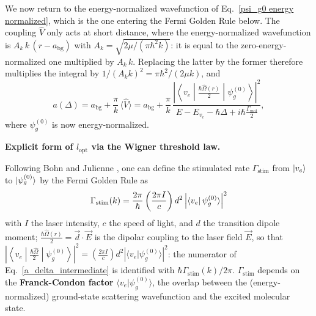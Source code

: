 We now return to the energy-normalized wavefunction of
Eq.~\ref{psi_g0 energy normalized}, which is the one entering the Fermi Golden Rule
below. The coupling $\hat V$ only acts at short distance, where the energy-normalized
wavefunction is $A_k\,k\,(r-a_{\text{bg}})$ with $A_k=\sqrt{2\mu/(\pi\hbar^2k)}$: it is
equal to the zero-energy-normalized one multiplied by $A_k\,k$. Replacing the latter by
the former therefore multiplies the integral by $1/(A_k k)^2=\pi\hbar^2/(2\mu k)$, and
\begin{equation}
    a(\Delta) = a_{\text{bg}} + \frac{\pi}{k}\,\langle\hat V\rangle
    = a_{\text{bg}} + \frac{\pi}{k}\,
    \frac{\left|\left\langle v_e\middle|\frac{\hbar\hat\Omega(r)}{2}\middle|\psi_g^{(0)}\right\rangle\right|^2}
    {E-E_{v_e}-\hbar\Delta+i\hbar\frac{\Gamma_{\text{mol}}}{2}},
    \label{a_delta_intermediate}
\end{equation}
where $\psi_g^{(0)}$ is now energy-normalized.


\textbf{Explicit form of $l_{\text{opt}}$ via the Wigner threshold law.}

Following Bohn and Julienne \cite{bohn1997_prospects}, one can define the
stimulated rate $\Gamma_{\text{stim}}$ from $\ket{v_e}$ to $\ket{\psi_g^{(0)}}$
by the Fermi Golden Rule as
\begin{equation}
    \Gamma_{\text{stim}}(k) = \frac{2\pi}{\hbar}\left(\frac{2\pi I}{c}\right)d^2\left| \bra{v_e} \psi_g^{(0)} \rangle \right|^2
    \label{gamma_stim_def}
\end{equation}
with $I$ the laser intensity, $c$ the speed of light, and $d$ the transition
dipole moment; $\frac{\hbar\hat\Omega(r)}{2}=\vec d\cdot\vec E$ is the dipolar
coupling to the laser field $\vec E$, so that
$\left|\left\langle v_e\middle|\frac{\hbar\hat\Omega}{2}\middle|\psi_g^{(0)}\right\rangle\right|^2
=\left(\frac{2\pi I}{c}\right)d^2\left|\langle v_e\vert\psi_g^{(0)}\rangle\right|^2$: the
numerator of Eq.~\ref{a_delta_intermediate} is identified with
$\hbar\Gamma_{\text{stim}}(k)/2\pi$. $\Gamma_{\text{stim}}$ depends on the \textbf{Franck-Condon factor} $\langle v_e\vert\psi_g^{(0)}\rangle$,
the overlap between the (energy-normalized) ground-state scattering
wavefunction and the excited molecular state.

